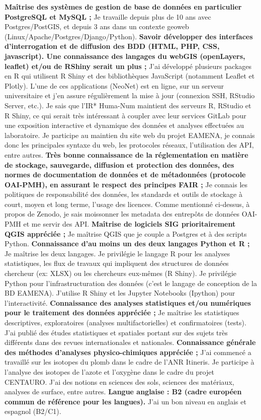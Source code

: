 \documentclass[12pt]{article}
\begin{document}
\textbf{Maîtrise des systèmes de gestion de base de données en particulier PostgreSQL et MySQL ;}
Je travaille depuis plus de 10 ans avec Postgres/PostGIS, et depuis 3 ans dans un contexte geoweb
(Linux/Apache/Postgres/Django/Python).
\smallbreak
\textbf{Savoir développer des interfaces d'interrogation et de diffusion des BDD (HTML, PHP, CSS, javascript). Une connaissance
des langages du webGIS (openLayers, leaflet) et/ou de RShiny serait un plus ;}
J'ai développé plusieurs packages en R qui utilisent R Shiny et des bibliothèques JavaScript (notamment Leaflet et Plotly).
L'une de ces applications (NeoNet) est en ligne, sur un serveur universitaire et j'en assure régulièrement la mise à jour
(connexion SSH, RStudio Server, etc.). Je sais que l'IR* Huma-Num maintient des serveurs R, RStudio et R Shiny, ce qui serait
très intéressant à coupler avec leur services GitLab pour une exposition interactive et dynamique des données et analyses
effectuées au laboratoire. Je participe au maintien du site web du projet EAMENA, je connais donc les principales syntaxe du
web, les protocoles réseaux, l'utilisation des API, entre autres.
\smallbreak
\textbf{Très bonne connaissance de la réglementation en matière de stockage, sauvegarde, diffusion et protection des données,
des normes de documentation de données et de métadonnées (protocole OAI-PMH), en assurant le respect des principes
FAIR ;}
Je connais les politiques de responsabilité des données, les standards et outils de stockage à court, moyen et long terme,
l'usage des licences. Comme mentionné ci-dessus, à propos de Zenodo, je sais moissonner les metadata des entrepôts de
données OAI-PMH et me servir des API.
\smallbreak
\textbf{Maîtrise de logiciels SIG prioritairement QGIS appréciée ;}
Je maîtrise QGIS que je couple a Postgres et à des scripts Python. 
\smallbreak
\textbf{Connaissance d'au moins un des deux langages Python et R ;}
Je maîtrise les deux langages. Je privilégie le langage R pour les analyses statistiques, les flux de travaux qui impliquent
des structures de données chercheur (ex: XLSX) ou les chercheurs eux-mêmes (R Shiny). Je privilégie Python pour
l'infrastructuration des données (c'est le langage de conception de la BD EAMENA). J'utilise R Shiny et les Jupyter Notebooks
(Ipython) pour l'interactivité.
\smallbreak
\textbf{Connaissance des analyses statistiques et/ou numériques pour le traitement des données appréciée ;}
Je maîtrise les statistiques descriptives, exploratoires (analyses multifactorielles) et confirmatoires (tests). J'ai publié des
études statistiques et spatiales portant sur des sujets très différents dans des revues internationales et nationales.
\smallbreak
\textbf{Connaissance générale des méthodes d'analyses physico-chimiques appréciée ;}
J'ai commencé a travaillé sur les isotopes du plomb dans le cadre de l'ANR Itineris. Je participe à l'analyse des isotopes de
l'azote et l'oxygène dans le cadre du projet CENTAURO. J'ai des notions en sciences des sols, sciences des matériaux,
analyses de surface, entre autres.
\smallbreak
\textbf{Langue anglaise : B2 (cadre européen commun de référence pour les langues).}
J'ai un bon niveau en anglais et espagnol (B2/C1).
\end{document}
